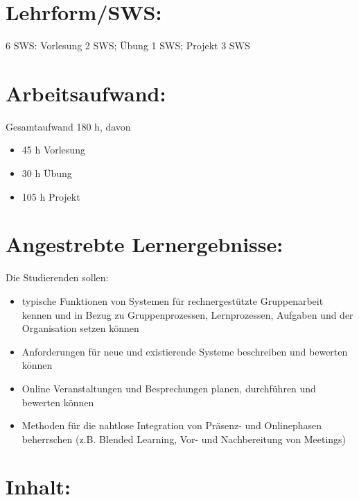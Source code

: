 \section*{Lehrform/SWS:}\label{lehrformsws-13}

6 SWS: Vorlesung 2 SWS; Übung 1 SWS; Projekt 3 SWS

\section*{Arbeitsaufwand:}\label{arbeitsaufwand-19}

Gesamtaufwand 180 h, davon

\begin{itemize}
\tightlist
\item
  45 h Vorlesung
\item
  30 h Übung
\item
  105 h Projekt
\end{itemize}

\section*{Angestrebte
Lernergebnisse:}\label{angestrebte-lernergebnisse-13}

Die Studierenden sollen:

\begin{itemize}
\tightlist
\item
  typische Funktionen von Systemen für rechnergestützte Gruppenarbeit
  kennen und in Bezug zu Gruppenprozessen, Lernprozessen, Aufgaben und
  der Organisation setzen können
\item
  Anforderungen für neue und existierende Systeme beschreiben und
  bewerten können
\item
  Online Veranstaltungen und Besprechungen planen, durchführen und
  bewerten können
\item
  Methoden für die nahtlose Integration von Präsenz- und Onlinephasen
  beherrschen (z.B. Blended Learning, Vor- und Nachbereitung von
  Meetings)
\end{itemize}

\section*{Inhalt:}\label{inhalt-13}

